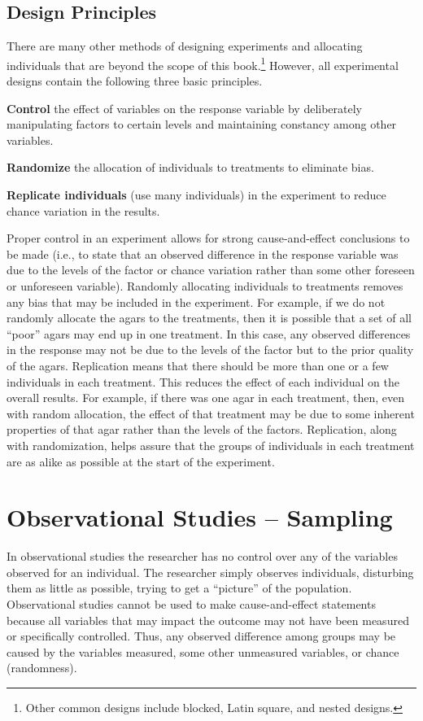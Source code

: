 \documentclass[10pt,openany]{book}\usepackage[]{graphicx}\usepackage[]{color}
\begin{document}
\subsection{Design Principles}
There are many other methods of designing experiments and allocating individuals that are beyond the scope of this book.\footnote{Other common designs include blocked, Latin square, and nested designs.} However, all experimental designs contain the following three basic principles.
\begin{Enumerate}
  \item \textbf{Control} the effect of variables on the response variable by deliberately manipulating factors to certain levels and maintaining constancy among other variables.
  \item \textbf{Randomize} the allocation of individuals to treatments to eliminate bias.
  \item \textbf{Replicate individuals} (use many individuals) in the experiment to reduce chance variation in the results.
\end{Enumerate}

Proper control in an experiment allows for strong cause-and-effect conclusions to be made (i.e., to state that an observed difference in the response variable was due to the levels of the factor or chance variation rather than some other foreseen or unforeseen variable). Randomly allocating individuals to treatments removes any bias that may be included in the experiment. For example, if we do not randomly allocate the agars to the treatments, then it is possible that a set of all ``poor'' agars may end up in one treatment. In this case, any observed differences in the response may not be due to the levels of the factor but to the prior quality of the agars. Replication means that there should be more than one or a few individuals in each treatment. This reduces the effect of each individual on the overall results. For example, if there was one agar in each treatment, then, even with random allocation, the effect of that treatment may be due to some inherent properties of that agar rather than the levels of the factors. Replication, along with randomization, helps assure that the groups of individuals in each treatment are as alike as possible at the start of the experiment.


\section{Observational Studies -- Sampling}
In observational studies the researcher has no control over any of the variables observed for an individual. The researcher simply observes individuals, disturbing them as little as possible, trying to get a ``picture'' of the population. Observational studies cannot be used to make cause-and-effect statements because all variables that may impact the outcome may not have been measured or specifically controlled. Thus, any observed difference among groups may be caused by the variables measured, some other unmeasured variables, or chance (randomness).
\end{document}
